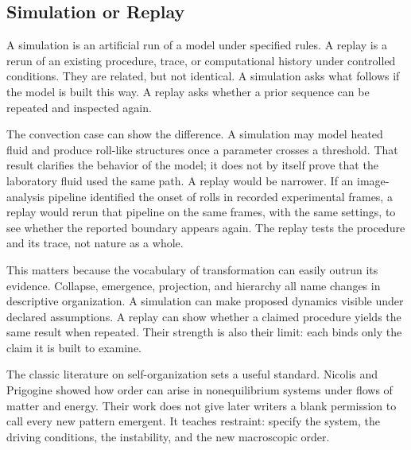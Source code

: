 \documentclass[11pt,a4paper,openany]{book}
\begin{document}
\subsection{Simulation or Replay}
A simulation is an artificial run of a model under specified rules. A replay is a rerun of an existing procedure, trace, or computational history under controlled conditions. They are related, but not identical. A simulation asks what follows if the model is built this way. A replay asks whether a prior sequence can be repeated and inspected again. \cite{haken_synergetics,nicolis_prigogine_selforg}\par
The convection case can show the difference. A simulation may model heated fluid and produce roll-like structures once a parameter crosses a threshold. That result clarifies the behavior of the model; it does not by itself prove that the laboratory fluid used the same path. A replay would be narrower. If an image-analysis pipeline identified the onset of rolls in recorded experimental frames, a replay would rerun that pipeline on the same frames, with the same settings, to see whether the reported boundary appears again. The replay tests the procedure and its trace, not nature as a whole.\par
This matters because the vocabulary of transformation can easily outrun its evidence. Collapse, emergence, projection, and hierarchy all name changes in descriptive organization. A simulation can make proposed dynamics visible under declared assumptions. A replay can show whether a claimed procedure yields the same result when repeated. Their strength is also their limit: each binds only the claim it is built to examine.\par
The classic literature on self-organization sets a useful standard. Nicolis and Prigogine showed how order can arise in nonequilibrium systems under flows of matter and energy. Their work does not give later writers a blank permission to call every new pattern emergent. It teaches restraint: specify the system, the driving conditions, the instability, and the new macroscopic order.\par
\end{document}
